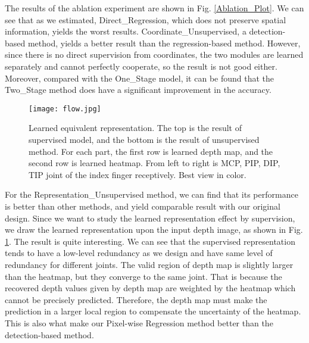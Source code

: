 \documentclass[journal]{IEEEtran}
\begin{document}
The results of the ablation experiment are shown in Fig\@. \ref{Ablation_Plot}. 
We can see that as we estimated, Direct\_Regression, which does not preserve spatial information, yields the worst results. 
Coordinate\_Unsupervised, a detection-based method, yields a better result than the regression-based method. 
However, since there is no direct supervision from coordinates, the two modules are learned separately and cannot perfectly cooperate, so the result is not good either. 
Moreover, compared with the One\_Stage model, it can be found that the Two\_Stage method does have a significant improvement in the accuracy. 

\begin{figure}[!t]
  \centering
  \texttt{[image: flow.jpg]}
  \caption{Learned equivalent representation. 
  The top is the result of supervised model, and the bottom is the result of unsupervised method. 
  For each part, the first row is learned depth map, and the second row is learned heatmap. 
  From left to right is MCP, PIP, DIP, TIP joint of the index finger receptively. Best view in color.
  }
  \label{Ablation_Image}
\end{figure}

For the Representation\_Unsupervised method, we can find that its performance is better than other methods, 
and yield comparable result with our original design. 
Since we want to study the learned representation effect by supervision, 
we draw the learned representation upon the input depth image, as shown in Fig\@. \ref{Ablation_Image}.  
The result is quite interesting. 
We can see that the supervised representation tends to have a low-level redundancy as we design and have same level of redundancy for different joints. 
The valid region of depth map is slightly larger than the heatmap, but they converge to the same joint. 
That is because the recovered depth values given by depth map are weighted by the heatmap which cannot be precisely predicted. 
Therefore, the depth map must make the prediction in a larger local region to compensate the uncertainty of the heatmap. 
This is also what make our Pixel-wise Regression method better than the detection-based method. 
\end{document}

